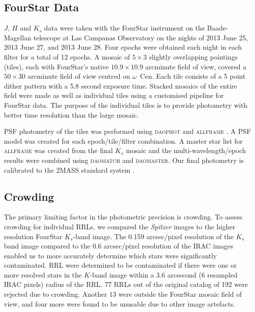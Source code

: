 \documentclass[a4paper,fleqn,usenatbib]{mnras}
\begin{document}
\subsection{FourStar Data}
\label{sec:fourstar_reduction}

$J$, $H$ and $K_s$ data were taken with the FourStar instrument on the Baade-Magellan telescope at Las Campanas Observatory \citep{2013PASP..125..654P} on the nights of 2013 June 25, 2013 June 27, and 2013 June 28. Four epochs were obtained each night in each filter for a total of 12 epochs. A mosaic of $5\times3$ slightly overlapping pointings (tiles), each with FourStar's native $10.9 \times 10.9$ arcminute field of view, covered a $50\times30$ arcminute field of view centred on $\omega$~Cen. Each tile consists of a 5 point dither pattern with a 5.8 second exposure time. Stacked mosaics of the entire field were made as well as individual tiles using a customised pipeline for FourStar data. The purpose of the individual tiles is to provide photometry with better time resolution than the large mosaic. 

PSF photometry of the tiles was performed using \textsc{daophot} and \textsc{allframe} \citep{1987PASP...99..191S, 1994PASP..106..250S}. A PSF model was created for each epoch/tile/filter combination. A master star list for \textsc{allframe} was created from the final $K_s$ mosaic and the multi-wavelength/epoch results were combined using \textsc{daomatch} and \textsc{daomaster}. Our final photometry is calibrated to the 2MASS standard system \citep{2006AJ....131.1163S}. 

\subsection{Crowding}
\label{sec:crowding}

The primary limiting factor in the photometric precision is crowding. To assess crowding for individual RRLs, we compared the {\it Spitzer} images to the higher resolution FourStar $K_s$-band image. The 0.159 arcsec/pixel resolution of the $K_s$ band image compared to the 0.6 arcsec/pixel resolution of the IRAC images enabled us to more accurately determine which stars were significantly contaminated. RRL were determined to be contaminated if there were one or more resolved stars in the $K$-band image within a 3.6 arcsecond (6 resampled IRAC pixels) radius of the RRL. 77 RRLs out of the original \citet{2004A&A...424.1101K} catalog of 192  were rejected due to crowding. Another 13 were outside the FourStar mosaic field of view, and four more were found to be unusable due to other image artefacts.
\end{document}
